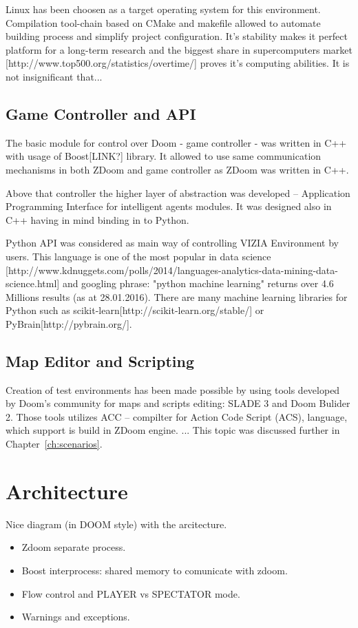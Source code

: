 Linux has been choosen as a target operating system for this environment.
Compilation tool-chain based on CMake and makefile allowed to automate building process and simplify project configuration.
It's stability makes it perfect platform for a long-term research and the biggest share in supercomputers market [http://www.top500.org/statistics/overtime/] proves it's computing abilities.
It is not insignificant that...

\subsection{Game Controller and API}


The basic module for control over Doom - game controller - was written in C++ with usage of Boost[LINK?] library.
It allowed to use same communication mechanisms in both ZDoom and game controller as ZDoom was written in C++.

Above that controller the higher layer of abstraction was developed -- Application Programming Interface for intelligent agents modules.
It was designed also in C++ having in mind binding in to Python.


Python API was considered as main way of controlling VIZIA Environment by users.
This language is one of the most popular in data science [http://www.kdnuggets.com/polls/2014/languages-analytics-data-mining-data-science.html] and googling phrase: "python machine learning" returns over 4.6 Millions results (as at 28.01.2016).
There are many machine learning libraries for Python such as scikit-learn[http://scikit-learn.org/stable/] or PyBrain[http://pybrain.org/].


\subsection{Map Editor and Scripting}


Creation of test environments has been made possible by using tools developed by Doom's community for maps and scripts editing: SLADE 3 and Doom Bulider 2. Those tools utilizes ACC -- compilter for Action Code Script (ACS), language, which support is build in ZDoom engine.
...
This topic was discussed further in Chapter~\ref{ch:scenarios}.

\section{Architecture}
Nice diagram (in DOOM style) with the arcitecture.
\begin{itemize}
\item Zdoom separate process.
\item Boost interprocess: shared memory to comunicate with zdoom.
\item Flow control and PLAYER vs SPECTATOR mode.
\item Warnings and exceptions.
\end{itemize}

